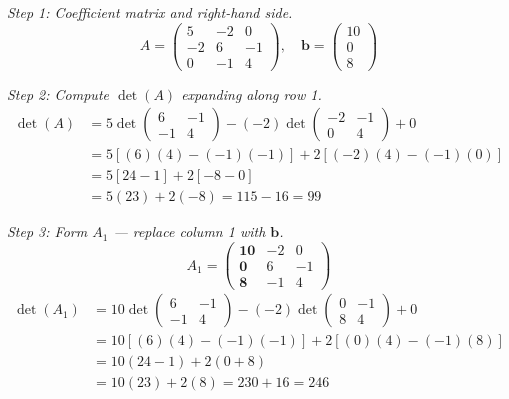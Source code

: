 \documentclass[12pt,a4paper]{article}
\begin{document}
\textit{Step 1: Coefficient matrix and right-hand side.}
\[
A = \begin{pmatrix} 5 & -2 & 0 \\ -2 & 6 & -1 \\ 0 & -1 & 4 \end{pmatrix}, \quad \mathbf{b} = \begin{pmatrix} 10 \\ 0 \\ 8 \end{pmatrix}
\]

\textit{Step 2: Compute \(\det(A)\) expanding along row 1.}
\begin{align*}
\det(A) &= 5\det\begin{pmatrix}6&-1\\-1&4\end{pmatrix}
          - (-2)\det\begin{pmatrix}-2&-1\\0&4\end{pmatrix}
          + 0 \\
&= 5[(6)(4)-(-1)(-1)] + 2[(-2)(4)-(-1)(0)] \\
&= 5[24-1] + 2[-8-0] \\
&= 5(23) + 2(-8) = 115 - 16 = 99
\end{align*}

\textit{Step 3: Form \(A_1\) --- replace column 1 with \(\mathbf{b}\).}
\[
A_1 = \begin{pmatrix} \mathbf{10} & -2 & 0 \\ \mathbf{0} & 6 & -1 \\ \mathbf{8} & -1 & 4 \end{pmatrix}
\]
\begin{align*}
\det(A_1) &= 10\det\begin{pmatrix}6&-1\\-1&4\end{pmatrix}
            - (-2)\det\begin{pmatrix}0&-1\\8&4\end{pmatrix}
            + 0 \\
&= 10[(6)(4)-(-1)(-1)] + 2[(0)(4)-(-1)(8)] \\
&= 10(24-1) + 2(0+8) \\
&= 10(23) + 2(8) = 230 + 16 = 246
\end{align*}
\end{document}
